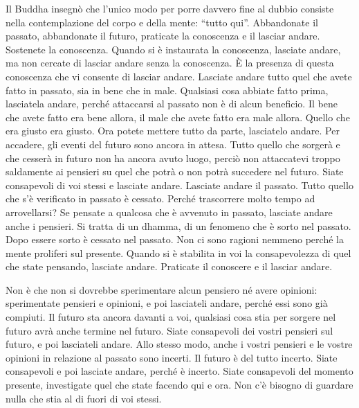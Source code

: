 Il Buddha insegnò che l'unico modo per porre davvero fine al dubbio
consiste nella contemplazione del corpo e della mente: ``tutto qui''.
Abbandonate il passato, abbandonate il futuro, praticate la conoscenza e
il lasciar andare. Sostenete la conoscenza. Quando si è instaurata la
conoscenza, lasciate andare, ma non cercate di lasciar andare senza la
conoscenza. È la presenza di questa conoscenza che vi consente di
lasciar andare. Lasciate andare tutto quel che avete fatto in passato,
sia in bene che in male. Qualsiasi cosa abbiate fatto prima, lasciatela
andare, perché attaccarsi al passato non è di alcun beneficio. Il bene
che avete fatto era bene allora, il male che avete fatto era male
allora. Quello che era giusto era giusto. Ora potete mettere tutto da
parte, lasciatelo andare. Per accadere, gli eventi del futuro sono
ancora in attesa. Tutto quello che sorgerà e che cesserà in futuro non
ha ancora avuto luogo, perciò non attaccatevi troppo saldamente ai
pensieri su quel che potrà o non potrà succedere nel futuro. Siate
consapevoli di voi stessi e lasciate andare. Lasciate andare il passato.
Tutto quello che s'è verificato in passato è cessato. Perché trascorrere
molto tempo ad arrovellarsi? Se pensate a qualcosa che è avvenuto in
passato, lasciate andare anche i pensieri. Si tratta di un
dhamma, di un fenomeno che è sorto nel passato. Dopo essere sorto
è cessato nel passato. Non ci sono ragioni nemmeno perché la mente
proliferi sul presente. Quando si è stabilita in voi la consapevolezza
di quel che state pensando, lasciate andare. Praticate il conoscere e il
lasciar andare.

Non è che non si dovrebbe sperimentare alcun pensiero né avere opinioni:
sperimentate pensieri e opinioni, e poi lasciateli andare, perché essi
sono già compiuti. Il futuro sta ancora davanti a voi, qualsiasi cosa
stia per sorgere nel futuro avrà anche termine nel futuro. Siate
consapevoli dei vostri pensieri sul futuro, e poi lasciateli andare.
Allo stesso modo, anche i vostri pensieri e le vostre opinioni in
relazione al passato sono incerti. Il futuro è del tutto incerto. Siate
consapevoli e poi lasciate andare, perché è incerto. Siate consapevoli
del momento presente, investigate quel che state facendo qui e ora. Non
c'è bisogno di guardare nulla che stia al di fuori di voi stessi.

